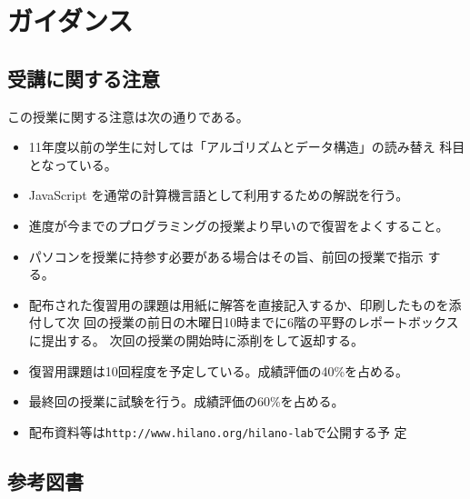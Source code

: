 
\Textfalse
\renewcommand{\postchaptername}{回}
\newcommand{\Ans}[1]{}


\frontmatter
\maketitle
\tableofcontents
\mainmatter
\chapter{ガイダンス}
\section{受講に関する注意}
この授業に関する注意は次の通りである。
\begin{itemize}
 \item 11年度以前の学生に対しては「アルゴリズムとデータ構造」の読み替え
       科目となっている。
 \item JavaScript を通常の計算機言語として利用するための解説を行う。
 \item 進度が今までのプログラミングの授業より早いので復習をよくすること。
 \item パソコンを授業に持参す必要がある場合はその旨、前回の授業で指示
       する。
  \item 配布された復習用の課題は用紙に解答を直接記入するか、印刷したものを添付して次
        回の授業の前日の木曜日10時までに6階の平野のレポートボックスに提出する。
        次回の授業の開始時に添削をして返却する。
 \item 復習用課題は10回程度を予定している。成績評価の40\%を占める。
\item 最終回の授業に試験を行う。成績評価の60\%を占める。
 \item 配布資料等は\texttt{http://www.hilano.org/hilano-lab}で公開する予
       定
\end{itemize}
\section{参考図書}

